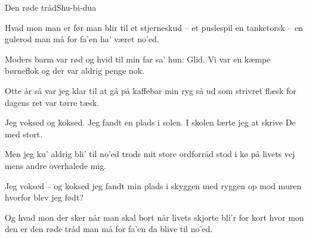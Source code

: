 \begin{sang}{Den røde tråd}{Shu-bi-dua}

\begin{vers}
Hvad mon man er før man blir til
et stjerneskud -- et puslespil
en tanketorsk -- en gulerod
man må for fa'en ha' været no'ed.
\end{vers}

\begin{vers}
Moders barm var rød og hvid
til min far sa' hun: Glid.
Vi var en kæmpe børneflok
og der var aldrig penge nok.
\end{vers}

\begin{vers}
Otte år så var jeg klar
til at gå på kaffebar
min ryg så ud som strivret flæsk
for dagens ret var tørre tæsk.
\end{vers}

\begin{omkvaed}
Jeg voksed og koksed.
Jeg fandt en plads i solen.
I skolen lærte jeg at
skrive De med stort.
\end{omkvaed}

\begin{vers}
Men jeg ku' aldrig bli' til no'ed
trods mit store ordforråd
stod i kø på livets vej
mens andre overhalede mig.
\end{vers}

\begin{omkvaed}
Jeg voksed -- og koksed
jeg fandt min plads i skyggen
med ryggen op mod muren
hvorfor blev jeg født?
\end{omkvaed}

\begin{vers}
Og hvad mon der sker når man skal bort
når livets skjorte bli'r for kort
hvor mon den er den røde tråd
man må for fa'en da blive til no'ed.
\end{vers}
\laps
\end{sang}